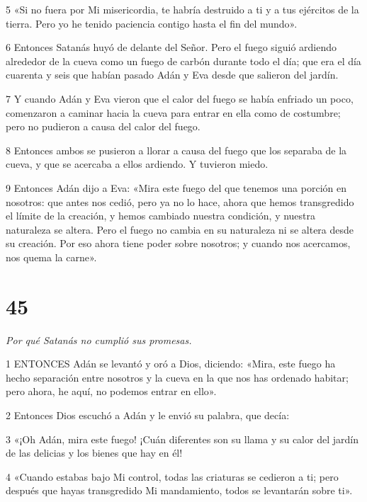 \par 5 «Si no fuera por Mi misericordia, te habría destruido a ti y a tus ejércitos de la tierra. Pero yo he tenido paciencia contigo hasta el fin del mundo».

\par 6 Entonces Satanás huyó de delante del Señor. Pero el fuego siguió ardiendo alrededor de la cueva como un fuego de carbón durante todo el día; que era el día cuarenta y seis que habían pasado Adán y Eva desde que salieron del jardín.

\par 7 Y cuando Adán y Eva vieron que el calor del fuego se había enfriado un poco, comenzaron a caminar hacia la cueva para entrar en ella como de costumbre; pero no pudieron a causa del calor del fuego.

\par 8 Entonces ambos se pusieron a llorar a causa del fuego que los separaba de la cueva, y que se acercaba a ellos ardiendo. Y tuvieron miedo.

\par 9 Entonces Adán dijo a Eva: «Mira este fuego del que tenemos una porción en nosotros: que antes nos cedió, pero ya no lo hace, ahora que hemos transgredido el límite de la creación, y hemos cambiado nuestra condición, y nuestra naturaleza se altera. Pero el fuego no cambia en su naturaleza ni se altera desde su creación. Por eso ahora tiene poder sobre nosotros; y cuando nos acercamos, nos quema la carne».

\chapter{45}

\par \textit{Por qué Satanás no cumplió sus promesas.}

\par 1 ENTONCES Adán se levantó y oró a Dios, diciendo: «Mira, este fuego ha hecho separación entre nosotros y la cueva en la que nos has ordenado habitar; pero ahora, he aquí, no podemos entrar en ello».

\par 2 Entonces Dios escuchó a Adán y le envió su palabra, que decía:

\par 3 «¡Oh Adán, mira este fuego! ¡Cuán diferentes son su llama y su calor del jardín de las delicias y los bienes que hay en él!

\par 4 «Cuando estabas bajo Mi control, todas las criaturas se cedieron a ti; pero después que hayas transgredido Mi mandamiento, todos se levantarán sobre ti».


